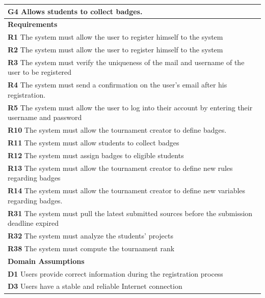 \begin{table}[H]
    \begin{tabularx}{\textwidth}{X}
        \toprule
        \textbf{G4} Allows students to collect badges.                                                 \\ \midrule
        \textbf{Requirements}                                                                                                        \\ \midrule
        \textbf{R1} The system must allow the user to register himself to the system                                                  \\
        \textbf{R2} The system must allow the user to register himself to the system                                               \\ 
        \textbf{R3} The system must verify the uniqueness of the mail and username of the user to be registered                                        \\ 
        \textbf{R4} The system must send a confirmation on the user's email after his registration.                         \\ 
        \textbf{R5} The system must allow the user to log into their account by entering their username and password           \\ 
        \textbf{R10} The system must allow the tournament creator to define badges.      \\ 
        \textbf{R11} The system must allow students to collect badges        \\ 
        \textbf{R12} The system must assign badges to eligible students          \\  
        \textbf{R13} The system must allow the tournament creator to define new rules regarding badges  \\  
        \textbf{R14} The system must allow the tournament creator to define new variables regarding badges.         \\ 
        \textbf{R31} The system must pull the latest submitted sources before the submission deadline expired     \\ 
        \textbf{R32} The system must analyze the students' projects      \\ 
        \textbf{R38} The system must compute the tournament rank                 \\ 
        \midrule
        \textbf{Domain Assumptions}                                                                                                  \\ \midrule
        \textbf{D1} Users provide correct information during the registration process \\          
        \textbf{D3} Users have a stable and reliable Internet connection \\
        \bottomrule
    \end{tabularx}
\end{table}

